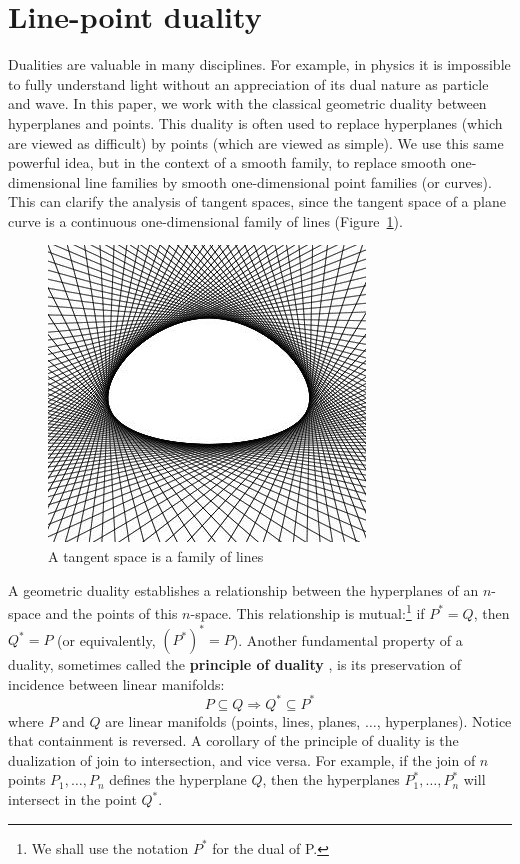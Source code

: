 \documentclass[12pt]{article}
\begin{document}
\section{Line-point duality}
\label{sec:duality}

Dualities are valuable in many disciplines.
For example, in physics it is impossible to fully understand light without
an appreciation of its dual nature as particle and wave.
In this paper, 
we work with the classical geometric duality between hyperplanes and points.
This duality is often used to replace hyperplanes (which are viewed as difficult)
by points (which are viewed as simple).
We use this same powerful idea, but in the context of a smooth family,
to replace smooth one-dimensional line families by smooth one-dimensional
point families (or curves).
This can clarify the analysis of tangent spaces,
since the tangent space of a plane curve is a continuous one-dimensional
family of lines (Figure~\ref{fig:linefamily}).

\begin{figure}[h]
\begin{center}
\includegraphics*[scale=.36]{img/jjdufamily.jpg}
\end{center}
\caption{A tangent space is a family of lines}
\label{fig:linefamily}
\end{figure}

A geometric duality establishes a relationship between the hyperplanes 
of an $n$-space and the points of this $n$-space.
This relationship is mutual:\footnote{We shall use the notation $P^*$ for the dual of P.} 
if $P^* = Q$, then $Q^* = P$ (or equivalently, $(P^*)^* = P$).
Another fundamental property of a duality,
sometimes called the {\bf principle of duality} \cite{pedoe70}, %
is its preservation of incidence between linear manifolds:
\[
P \subseteq Q \Rightarrow Q^* \subseteq P^*
\]
where $P$ and $Q$ are linear manifolds (points, lines, planes, $\ldots$, hyperplanes).  %
Notice that containment is reversed.
A corollary of the principle of duality is the dualization of join to intersection, and vice versa.
For example, if the join of $n$ points $P_1, \ldots, P_n$ defines the hyperplane $Q$,
then the hyperplanes $P_1^*, \ldots, P_n^*$ will intersect in the point $Q^*$.
\end{document}
